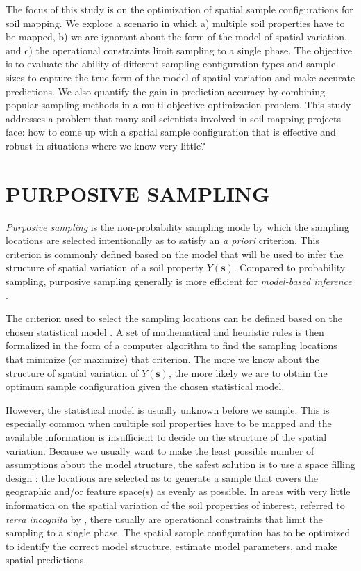 The focus of this study is on the optimization of spatial sample configurations for soil mapping. We explore a 
scenario in which a) multiple soil properties have to be mapped, b) we are ignorant about the form of the model 
of spatial variation, and c) the operational constraints limit sampling to a single phase. The objective is to 
evaluate the ability of different sampling configuration types and sample sizes to capture the true form of the 
model of spatial variation and make accurate predictions. We also quantify the gain in prediction accuracy by 
combining popular sampling methods in a multi-objective optimization problem. This study addresses a problem 
that many soil scientists involved in soil mapping projects face: how to come up with a spatial sample 
configuration that is effective and robust in situations where we know very little?

\section{PURPOSIVE SAMPLING}

\emph{Purposive sampling} is the non-probability sampling mode by which the sampling locations are selected 
intentionally as to satisfy an \textit{a priori} criterion. This criterion is commonly defined based on the 
model that will be used to infer the structure of spatial variation of a soil property $Y(\boldsymbol{s})$. 
Compared to probability sampling, purposive sampling generally is more efficient for \emph{model-based 
inference} \cite{deGruijterEtAl2006}.

The criterion used to select the sampling locations can be defined based on the chosen statistical model 
\cite{deGruijterEtAl2006, Mueller2007, WebsterEtAl2013}. A set of mathematical and heuristic rules is then 
formalized in the form of a computer algorithm to find the sampling locations that minimize (or maximize) that 
criterion. The more we know about the structure of spatial variation of $Y(\boldsymbol{s})$, the more likely we 
are to obtain the optimum sample configuration given the chosen statistical model.

However, the statistical model is usually unknown before we sample. This is especially common when multiple 
soil properties have to be mapped and the available information is insufficient to decide on the structure of 
the spatial variation. Because we usually want to make the least possible number of assumptions about the model 
structure, the safest solution is to use a space filling design \cite{HenglEtAl2003a, deGruijterEtAl2006, 
Mueller2007, WalvoortEtAl2010}: the locations are selected as to generate a sample that covers the geographic 
and/or feature space(s) as evenly as possible. In areas with very little information on the spatial variation 
of the soil properties of interest, referred to \emph{terra incognita} by \citet{WebsterEtAl2007}, there 
usually are operational constraints that limit the sampling to a single phase. The spatial sample configuration 
has to be optimized to identify the correct model structure, estimate model parameters, and make spatial 
predictions.

